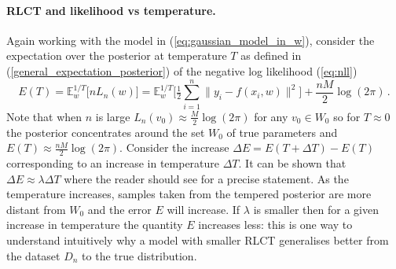 \documentclass[11pt]{article}
\def\lto{\longrightarrow}
\numberwithin{equation}{section}
\theoremstyle{plain}
\theoremstyle{definition}
\begin{document}
\paragraph{RLCT and likelihood vs temperature.}
Again working with the model in (\ref{eq:gaussian_model_in_w}), consider the expectation over the posterior at temperature $T$ as defined in (\ref{general_expectation_posterior}) of the negative log likelihood (\ref{eq:nll})
$$
E(T) = \mathbb{E}^{1/T}_w\big[nL_n(w) \big] = \mathbb{E}_w^{1/T}\Big[ \tfrac{1}{2} \sum_{i=1}^n \| y_i - f(x_i, w) \|^2 \Big] + \frac{nM}{2} \log(2\pi)\,.
$$
Note that when $n$ is large $L_n(v_0) \approx \frac{M}{2} \log(2\pi)$ for any $v_0 \in W_0$ so for $T \approx 0$ the posterior concentrates around the set $W_0$ of true parameters and $E(T) \approx \frac{nM}{2} \log(2\pi)$. Consider the increase $\Delta E = E(T + \Delta T) - E(T)$ corresponding to an increase in temperature $\Delta T$. It can be shown that 
$
\Delta E \approx \lambda \Delta T
$
where the reader should see \citep[Corollary 3]{watanabe_widely_2013} for a precise statement. As the temperature increases, samples taken from the tempered posterior are more distant from $W_0$ and the error $E$ will increase. If $\lambda$ is smaller then for a given increase in temperature the quantity $E$ increases less: this is one way to understand intuitively why a model with smaller RLCT generalises better from the dataset $D_n$ to the true distribution.


\end{document}
